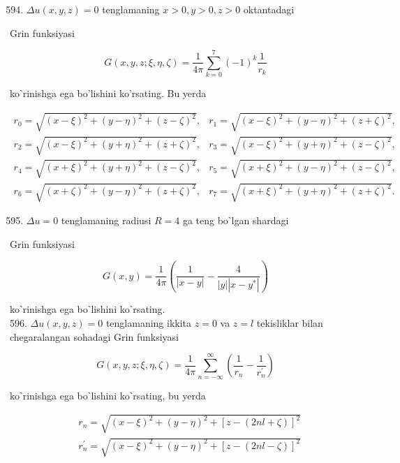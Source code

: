 \documentclass[10pt]{article}
\begin{document}
\begin{enumerate}
  \setcounter{enumi}{593}
  \item $\Delta u(x, y, z)=0$ tenglamaning $x>0, y>0, z>0$ oktantadagi
\end{enumerate}

Grin funksiyasi

$$
G(x, y, z ; \xi, \eta, \zeta)=\frac{1}{4 \pi} \sum_{k=0}^{7}(-1)^{k} \frac{1}{r_{k}}
$$

koˋrinishga ega bo'lishini ko'rsating. Bu yerda

$$
\begin{array}{ll}
r_{0}=\sqrt{(x-\xi)^{2}+(y-\eta)^{2}+(z-\zeta)^{2}}, & r_{1}=\sqrt{(x-\xi)^{2}+(y-\eta)^{2}+(z+\zeta)^{2}}, \\
r_{2}=\sqrt{(x-\xi)^{2}+(y+\eta)^{2}+(z+\zeta)^{2}}, & r_{3}=\sqrt{(x-\xi)^{2}+(y+\eta)^{2}+(z-\zeta)^{2}}, \\
r_{4}=\sqrt{(x+\xi)^{2}+(y+\eta)^{2}+(z-\zeta)^{2}}, & r_{5}=\sqrt{(x+\xi)^{2}+(y-\eta)^{2}+(z-\zeta)^{2}}, \\
r_{6}=\sqrt{(x+\zeta)^{2}+(y-\eta)^{2}+(z+\zeta)^{2}}, & r_{7}=\sqrt{(x+\xi)^{2}+(y+\eta)^{2}+(z+\zeta)^{2}} .
\end{array}
$$

\begin{enumerate}
  \setcounter{enumi}{594}
  \item $\Delta u=0$ tenglamaning radiusi $R=4$ ga teng boˋlgan shardagi
\end{enumerate}

Grin funksiyasi

$$
G(x, y)=\frac{1}{4 \pi}\left(\frac{1}{|x-y|}-\frac{4}{|y|\left|x-y^{*}\right|}\right)
$$

koˋrinishga ega boˋlishini koˋrsating.\\
596. $\Delta u(x, y, z)=0$ tenglamaning ikkita $z=0$ va $z=l$ tekisliklar bilan chegaralangan sohadagi Grin funksiyasi

$$
G(x, y, z ; \xi, \eta, \zeta)=\frac{1}{4 \pi} \sum_{n=-\infty}^{\infty}\left(\frac{1}{r_{n}}-\frac{1}{r_{n}^{\prime}}\right)
$$

koˋrinishga ega boˋlishini koˋrsating, bu yerda

$$
\begin{aligned}
& r_{n}=\sqrt{(x-\xi)^{2}+(y-\eta)^{2}+[z-(2 n l+\zeta)]^{2}} \\
& r_{n}^{\prime}=\sqrt{(x-\xi)^{2}+(y-\eta)^{2}+[z-(2 n l-\zeta)]^{2}}
\end{aligned}
$$
\end{document}
